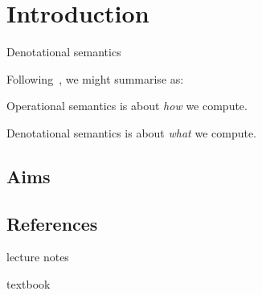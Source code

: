 \chapter{Introduction}

Denotational semantics~\cite{Scott1970,ScottStrachey1971}


Following~\cite{Escardo2007}, we might summarise as:

\begin{displayquote}
  Operational semantics is about \emph{how} we compute.

  Denotational semantics is about \emph{what} we compute.
\end{displayquote}

\section{Aims}

\section{References}

\cite{AbramskyJung1994,GierzEtAl2003,Streicher2006,Hart2020,Escardo2007}

\cite{PittsWinskellFiore2012} lecture notes

\cite{Winskel1993} textbook

\cite{Streicher2006,Gunther1992}


